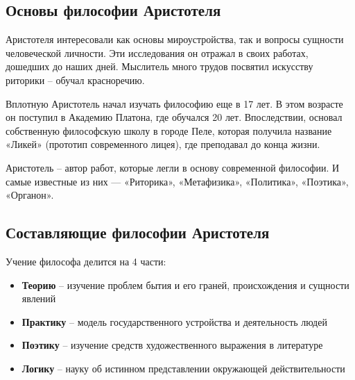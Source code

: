 \documentclass[
]{article}
\providecommand{\tightlist}{%
  \setlength{\itemsep}{0pt}\setlength{\parskip}{0pt}}
\begin{document}
\hypertarget{ux43eux441ux43dux43eux432ux44b-ux444ux438ux43bux43eux441ux43eux444ux438ux438-ux430ux440ux438ux441ux442ux43eux442ux435ux43bux44f}{%
\subsection{Основы философии
Аристотеля}\label{ux43eux441ux43dux43eux432ux44b-ux444ux438ux43bux43eux441ux43eux444ux438ux438-ux430ux440ux438ux441ux442ux43eux442ux435ux43bux44f}}

Аристотеля интересовали как основы мироустройства, так и вопросы
сущности человеческой личности. Эти исследования он отражал в своих
работах, дошедших до наших дней. Мыслитель много трудов посвятил
искусству риторики -- обучал красноречию.

Вплотную Аристотель начал изучать философию еще в 17 лет. В этом
возрасте он поступил в Академию Платона, где обучался 20 лет.
Впоследствии, основал собственную философскую школу в городе Пеле,
которая получила название «Ликей» (прототип современного лицея), где
преподавал до конца жизни.

Аристотель -- автор работ, которые легли в основу современной философии.
И самые известные из них --- «Риторика», «Метафизика», «Политика»,
«Поэтика», «Органон».

\hypertarget{ux441ux43eux441ux442ux430ux432ux43bux44fux44eux449ux438ux435-ux444ux438ux43bux43eux441ux43eux444ux438ux438-ux430ux440ux438ux441ux442ux43eux442ux435ux43bux44f}{%
\subsection{Составляющие философии
Аристотеля}\label{ux441ux43eux441ux442ux430ux432ux43bux44fux44eux449ux438ux435-ux444ux438ux43bux43eux441ux43eux444ux438ux438-ux430ux440ux438ux441ux442ux43eux442ux435ux43bux44f}}

Учение философа делится на 4 части:

\begin{itemize}
\tightlist
\item
  \textbf{Теорию} -- изучение проблем бытия и его граней, происхождения
  и сущности явлений
\item
  \textbf{Практику} -- модель государственного устройства и деятельность
  людей
\item
  \textbf{Поэтику} -- изучение средств художественного выражения в
  литературе
\item
  \textbf{Логику} -- науку об истинном представлении окружающей
  действительности
\end{itemize}
\end{document}
